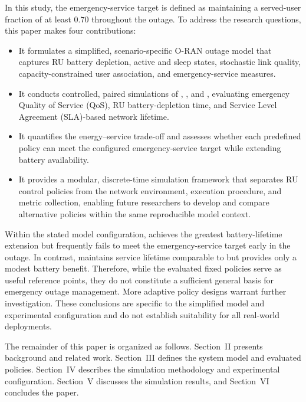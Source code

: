 In this study, the emergency-service target is defined as maintaining a served-user fraction of at least \(0.70\) throughout the outage. To address the research questions, this paper makes four contributions:
\begin{itemize}
    \item It formulates a simplified, scenario-specific O-RAN outage model that captures RU battery depletion, active and sleep states, stochastic link quality, capacity-constrained user association, and emergency-service measures.
    \item It conducts controlled, paired simulations of , , and , evaluating emergency Quality of Service (QoS), RU battery-depletion time, and Service Level Agreement (SLA)-based network lifetime.
    \item It quantifies the energy--service trade-off and assesses whether each predefined policy can meet the configured emergency-service target while extending battery availability.
    \item It provides a modular, discrete-time simulation framework that separates RU control policies from the network environment, execution procedure, and metric collection, enabling future researchers to develop and compare alternative policies within the same reproducible model context.
\end{itemize}

Within the stated model configuration,  achieves the greatest battery-lifetime extension but frequently fails to meet the emergency-service target early in the outage. In contrast,  maintains service lifetime comparable to  but provides only a modest battery benefit. Therefore, while the evaluated fixed policies serve as useful reference points, they do not constitute a sufficient general basis for emergency outage management. More adaptive policy designs warrant further investigation. These conclusions are specific to the simplified model and experimental configuration and do not establish suitability for all real-world deployments.

The remainder of this paper is organized as follows. Section~II presents background and related work. Section~III defines the system model and evaluated policies. Section~IV describes the simulation methodology and experimental configuration. Section~V discusses the simulation results, and Section~VI concludes the paper.
